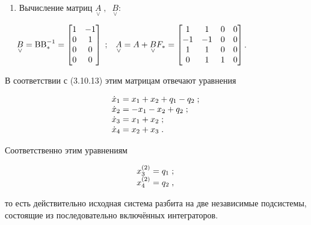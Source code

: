 \documentclass[a4paper]{article}
\newcounter{saveenum}
\newcommand\liststyleWWviiiNumlxxvi{%
\renewcommand\theenumi{\arabic{enumi}}
\renewcommand\theenumii{\alph{enumii}}
\renewcommand\theenumiii{\roman{enumiii}}
\renewcommand\theenumiv{\arabic{enumiv}}
\renewcommand\labelenumi{\theenumi.}
\renewcommand\labelenumii{\theenumii.}
\renewcommand\labelenumiii{\theenumiii.}
\renewcommand\labelenumiv{\theenumiv.}
}
\newcommand\normalsubformula[1]{\text{\mathversion{normal}$#1$}}
\begin{document}
\liststyleWWviiiNumlxxvi
\setcounter{saveenum}{\value{enumi}}
\begin{enumerate}
\setcounter{enumi}{\value{saveenum}}
\item {\begin{russian}\sffamily
Вычисление матриц  $\underset{\vee }{A}\;,\;\;\underset{\vee }{B}$:
\end{russian}}
\end{enumerate}
{\begin{russian}\sffamily
\textenglish{\ \ } $\underset{\vee }{B}=\normalsubformula{\text{BB}}_{\ast
}^{-1}=\left[\begin{matrix}1&-1\\0&1\\0&0\\0&0\end{matrix}\right]\;;\;\;\;\underset{\vee }{A}=A+\underset{\vee
}{B}F_{\ast }=\left[\begin{matrix}1&1&0&0\\-1&-1&0&0\\1&1&0&0\\0&1&1&0\end{matrix}\right]$.
\end{russian}}

{\begin{russian}\sffamily
В соответствии с (3.10.13) этим матрицам отвечают уравнения
\end{russian}}

\begin{equation*}
\begin{matrix}\dot x_1=x_1+x_2+q_1-q_2\;;\hfill\null \\\dot x_2=-x_1-x_2+q_2\;;\hfill\null \\\dot
x_3=x_1+x_2\;;\hfill\null \\\dot x_4=x_2+x_3\;.\hfill\null \end{matrix}\hfill 
\end{equation*}
{\begin{russian}\sffamily
Соответственно этим уравнениям
\end{russian}}

\begin{equation*}
\begin{matrix}x_3^{(2)}=q_1\;;\hfill\null \\x_4^{(2)}=q_2\;,\hfill\null \end{matrix}\hfill 
\end{equation*}
{\begin{russian}\sffamily
то есть действительно исходная система разбита на две независимые подсистемы, состоящие из последовательно включённых
интеграторов.
\end{russian}}
\end{document}
